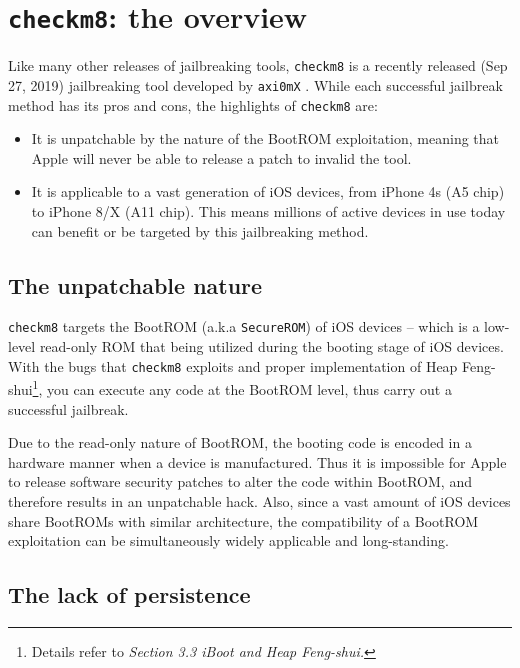 \documentclass[10pt]{article}
\newcommand{\inlinecode}{\texttt}
\begin{document}
\section{\inlinecode{checkm8}: the overview}

Like many other releases of jailbreaking tools, \inlinecode{checkm8} is a recently released (Sep 27, 2019) jailbreaking tool developed by \inlinecode{axi0mX} \cite{cite:2}. While each successful jailbreak method has its pros and cons, the highlights of \inlinecode{checkm8} are:
\begin{itemize}
    \item It is unpatchable by the nature of the BootROM exploitation, meaning that Apple will never be able to release a patch to invalid the tool.
    \item It is applicable to a vast generation of iOS devices, from iPhone 4s (A5 chip) to iPhone 8/X (A11 chip). This means millions of active devices in use today can benefit or be targeted by this jailbreaking method.
\end{itemize}

\subsection{The unpatchable nature}

\inlinecode{checkm8} targets the BootROM (a.k.a \inlinecode{SecureROM}) of iOS devices -- which is a low-level read-only ROM that being utilized during the booting stage of iOS devices. With the bugs that \inlinecode{checkm8} exploits and proper implementation of Heap Feng-shui\footnote{Details refer to \textit{Section 3.3 iBoot and Heap Feng-shui.}}, you can execute any code at the BootROM level, thus carry out a successful jailbreak.

Due to the read-only nature of BootROM, the booting code is encoded in a hardware manner when a device is manufactured. Thus it is impossible for Apple to release software security patches to alter the code within BootROM, and therefore results in an unpatchable hack. Also, since a vast amount of iOS devices share BootROMs with similar architecture, the compatibility of a BootROM exploitation can be simultaneously widely applicable and long-standing.

\subsection{The lack of persistence}
\end{document}
